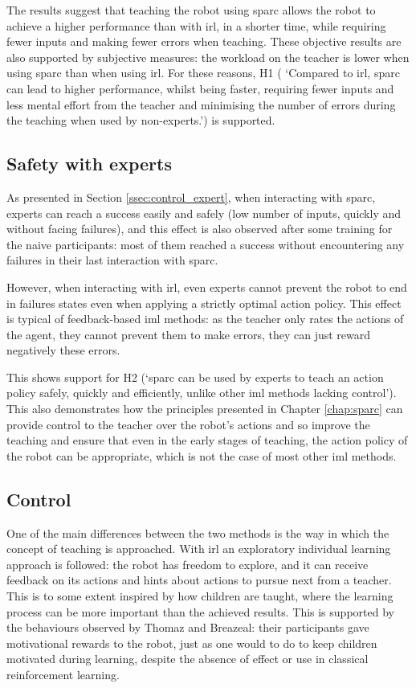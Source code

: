 The results suggest that teaching the robot using \gls{sparc} allows the robot to achieve a higher performance than with \gls{irl}, in a shorter time, while requiring fewer inputs and making fewer errors when teaching. These objective results are also supported by subjective measures: the workload on the teacher is lower when using \gls{sparc} than when using \gls{irl}. For these reasons, H1 ( `Compared to \gls{irl}, \gls{sparc} can lead to higher performance, whilst being faster, requiring fewer inputs and less mental effort from the teacher and minimising the number of errors during the teaching when used by non-experts.') is supported.

\subsection{Safety with experts}

As presented in Section \ref{ssec:control_expert}, when interacting with \gls{sparc}, experts can reach a success easily and safely (low number of inputs, quickly and without facing failures), and this effect is also observed after some training for the naive participants: most of them reached a success without encountering any failures in their last interaction with \gls{sparc}.

However, when interacting with \gls{irl}, even experts cannot prevent the robot to end in failures states even when applying a strictly optimal action policy. This effect is typical of feedback-based \gls{iml} methods: as the teacher only rates the actions of the agent, they cannot prevent them to make errors, they can just reward negatively these errors.

This shows support for H2 (`\gls{sparc} can be used by experts to teach an action policy safely, quickly and efficiently, unlike other \gls{iml} methods lacking control'). This also demonstrates how the principles presented in Chapter \ref{chap:sparc} can provide control to the teacher over the robot's actions and so improve the teaching and ensure that even in the early stages of teaching, the action policy of the robot can be appropriate, which is not the case of most other \gls{iml} methods.


\subsection{Control}
\label{sec:control}

One of the main differences between the two methods is the way in which the concept of teaching is approached. With \gls{irl} an exploratory individual learning approach is followed: the robot has freedom to explore, and it can receive feedback on its actions and hints about actions to pursue next from a teacher. This is to some extent inspired by how children are taught, where the learning process can be more important than the achieved results. This is supported by the behaviours observed by Thomaz and Breazeal: their participants gave motivational rewards to the robot, just as one would to do to keep children motivated during learning, despite the absence of effect or use in classical reinforcement learning.

